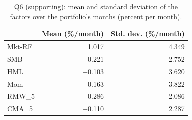 \begin{table}[!htbp]
\centering
\small
\caption{Q6 (supporting): mean and standard deviation of the factors over the portfolio's months (percent per month).}
\label{tab:q6d}
\begin{tabular}{lrr}
\toprule
 & Mean (\%/month) & Std. dev. (\%/month) \\
\midrule
Mkt-RF & 1.017 & 4.349 \\
SMB & $-$0.221 & 2.752 \\
HML & $-$0.103 & 3.620 \\
Mom & 0.163 & 3.822 \\
RMW\_5 & 0.286 & 2.086 \\
CMA\_5 & $-$0.110 & 2.287 \\
\bottomrule
\end{tabular}
\end{table}
